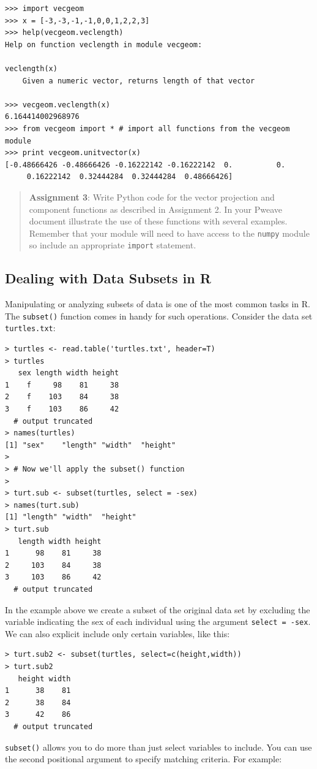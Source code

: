 \documentclass{article}
\begin{document}
\begin{lstlisting}
>>> import vecgeom
>>> x = [-3,-3,-1,-1,0,0,1,2,2,3]
>>> help(vecgeom.veclength)
Help on function veclength in module vecgeom:

veclength(x)
    Given a numeric vector, returns length of that vector

>>> vecgeom.veclength(x)
6.164414002968976
>>> from vecgeom import * # import all functions from the vecgeom module
>>> print vecgeom.unitvector(x)
[-0.48666426 -0.48666426 -0.16222142 -0.16222142  0.          0.   
     0.16222142  0.32444284  0.32444284  0.48666426]
\end{lstlisting}
\begin{quote}
\textbf{Assignment 3}: Write Python code for the vector projection and
component functions as described in Assignment 2. In your Pweave
document illustrate the use of these functions with several examples.
Remember that your module will need to have access to the
\lstinline!numpy! module so include an appropriate \lstinline!import!
statement.

\end{quote}
\subsection{Dealing with Data Subsets in R}

Manipulating or analyzing subsets of data is one of the most common
tasks in R. The \lstinline!subset()! function comes in handy for such
operations. Consider the data set \lstinline!turtles.txt!:

\begin{lstlisting}
> turtles <- read.table('turtles.txt', header=T)
> turtles
   sex length width height
1    f     98    81     38
2    f    103    84     38
3    f    103    86     42
  # output truncated
> names(turtles)
[1] "sex"    "length" "width"  "height"
>
> # Now we'll apply the subset() function
>
> turt.sub <- subset(turtles, select = -sex)
> names(turt.sub)
[1] "length" "width"  "height"
> turt.sub
   length width height
1      98    81     38
2     103    84     38
3     103    86     42
  # output truncated
\end{lstlisting}
In the example above we create a subset of the original data set by
excluding the variable indicating the sex of each individual using the
argument \lstinline!select = -sex!. We can also explicit include only
certain variables, like this:

\begin{lstlisting}
> turt.sub2 <- subset(turtles, select=c(height,width))
> turt.sub2
   height width
1      38    81
2      38    84
3      42    86
  # output truncated    
\end{lstlisting}
\lstinline!subset()! allows you to do more than just select variables to
include. You can use the second positional argument to specify matching
criteria. For example:
\end{document}
